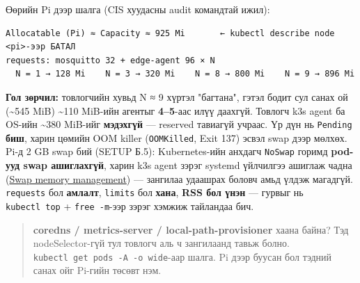 Өөрийн Pi дээр шалга (CIS хуудасны audit командтай ижил):

\begin{Shaded}
\begin{Highlighting}[]
\KeywordTok{|}   \KeywordTok{|} \KeywordTok{|}  \StringTok{\textquotesingle{} \textquotesingle{}}  \KeywordTok{|} 
\end{Highlighting}
\end{Shaded}

\begin{verbatim}
Allocatable (Pi) ≈ Capacity ≈ 925 Mi       ← kubectl describe node <pi>-ээр БАТАЛ
requests: mosquitto 32 + edge-agent 96 × N
  N = 1 → 128 Mi    N = 3 → 320 Mi    N = 8 → 800 Mi    N = 9 → 896 Mi
\end{verbatim}

\textbf{Гол зөрчил:} товлогчийн хувьд N ≈ 9 хүртэл "багтана", гэтэл бодит сул санах ой (\textasciitilde545 MiB) \textasciitilde110 MiB-ийн агентыг \textbf{4--5}-аас илүү даахгүй. Товлогч k3s agent ба OS-ийн \textasciitilde380 MiB-ийг \textbf{мэдэхгүй} --- reserved тавиагүй учраас. Үр дүн нь \texttt{Pending} \textbf{биш}, харин цөмийн OOM killer (\texttt{OOMKilled}, Exit 137) эсвэл swap дээр мөлхөх. Pi-д 2 GB swap бий (SETUP Б.5): Kubernetes-ийн анхдагч \texttt{NoSwap} горимд \textbf{pod-ууд swap ашиглахгүй}, харин k3s agent зэрэг systemd үйлчилгээ ашиглаж чадна (\href{https://kubernetes.io/docs/concepts/cluster-administration/swap-memory-management/}{Swap memory management}) --- зангилаа удаашрах боловч амьд үлдэж магадгүй. \texttt{requests} бол \textbf{амлалт}, \texttt{limits} бол \textbf{хана}, \textbf{RSS бол үнэн} --- гурвыг нь \texttt{kubectl\ top} + \texttt{free\ -m}-ээр зэрэг хэмжиж тайландаа бич.

\begin{quote}
\textbf{coredns / metrics-server / local-path-provisioner} хаана байна? Тэд nodeSelector-гүй тул товлогч аль ч зангилаанд тавьж болно. \texttt{kubectl\ get\ pods\ -A\ -o\ wide}-аар шалга. Pi дээр буусан бол тэдний санах ойг Pi-гийн төсөвт нэм.
\end{quote}

